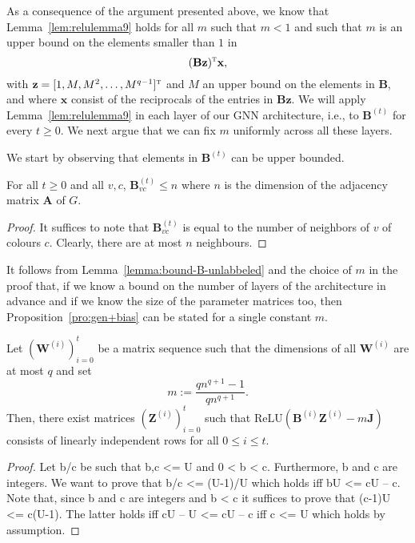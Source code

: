 As a consequence of the argument presented above, we know that Lemma~\ref{lem:relulemma9} holds for all $m$ such that $m<1$ and such that
$m$ is an upper bound on the elements smaller than $1$ in $$(\mathbf{B}\mathbf{z})^{\textsc{t}}\mathbf{x},$$
with $\mathbf{z}=[1,M,M^2,\ldots,M^{q-1}]^{\textsc{t}}$ and $M$ an upper bound on the elements in $\mathbf{B}$, and where $\mathbf{x}$ consist of the reciprocals of the entries in $\mathbf{B}\mathbf{z}$. We will apply Lemma~\ref{lem:relulemma9} in each layer of our GNN architecture, i.e., to $\mathbf{B}^{(t)}$ for every $t\geq 0$. We next argue that we can fix $m$ uniformly across all these layers.

We start by observing that elements in $\mathbf{B}^{(t)}$ can be upper bounded.
\begin{lemma}\label{lemma:bound-B-unlabbeled}
For all $t\geq 0$ and all $v,c$, $\mathbf{B}^{(t)}_{vc}\leq n$ where $n$ is the dimension of the adjacency matrix $\mathbf{A}$ of $G$.
\end{lemma}
\begin{proof}
It suffices to note that $\mathbf{B}^{(t)}_{vc}$ is equal to the number of neighbors of $v$ of colours $c$. Clearly, there are at most $n$ neighbours.
\end{proof}

It follows from
Lemma~\ref{lemma:bound-B-unlabbeled} and the choice of $m$ in the proof that, if we know
a bound on the number of layers of the architecture 
in advance and if we know
the size of the parameter matrices too, then Proposition~\ref{pro:gen+bias} can
be stated for a single constant $m$.
\begin{proposition}\label{pro:fixed-m}
    Let $(\mathbf{W}^{(i)})^t_{i=0}$ be a matrix sequence such that the dimensions
    of all $\mathbf{W}^{(i)}$ are at most $q$ and set
    \[
        m := \frac{qn^{q+1} - 1}{qn^{q+1}}.
    \]
    Then, there exist matrices $(\mathbf{Z}^{(i)})_{i=0}^t$ such that $\mathrm{ReLU}(\mathbf{B}^{(i)}\mathbf{Z}^{(i)} - m\mathbf{J})$ consists of linearly independent rows for all $0 \leq i \leq t$.
\end{proposition}
\begin{proof}
Let b/c be such that b,c <= U and 0 < b < c. Furthermore, b and c are integers. We want to prove that b/c <= (U-1)/U which holds iff bU <= cU – c. Note that, since b and c are integers and b < c it suffices to prove that (c-1)U <= c(U-1). The latter holds iff cU – U <= cU – c iff c <= U which holds by assumption.
\end{proof}

